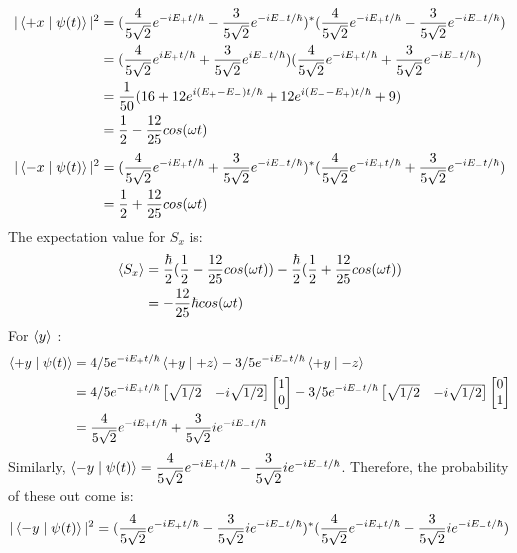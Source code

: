 \documentclass{article}
\providecommand{\Matrix}[1] {\begin{bmatrix} #1 \end{bmatrix}}
\theoremstyle{definition}
\theoremstyle{plain}
\begin{document}
\begin {enumerate}[itemindent=30pt,label=\bf Exercise {\arabic*}:]
\begin{align*}
	|\Braket{+x \mid \psi(t)}|^{2} &= (\dfrac{4}{5\sqrt{2}} e^{-iE_{+}t/\hbar}- \dfrac{3}{5\sqrt{2}} e^{-iE_{-}t/\hbar})^{*}(\dfrac{4}{5\sqrt{2}} e^{-iE_{+}t/\hbar}- \dfrac{3}{5\sqrt{2}} e^{-iE_{-}t/\hbar})\\ 
	&=(\dfrac{4}{5\sqrt{2}} e^{iE_{+}t/\hbar} + \dfrac{3}{5\sqrt{2}} e^{iE_{-}t/\hbar})(\dfrac{4}{5\sqrt{2}} e^{-iE_{+}t/\hbar} + \dfrac{3}{5\sqrt{2}} e^{-iE_{-}t/\hbar})\\  
	&= \dfrac{1}{50}(16 + 12e^{i(E_{+} - E_{-})t / \hbar} + 12e^{i(E_{-} - E_{+})t / \hbar} + 9)\\
	&= \dfrac{1}{2} - \dfrac{12}{25} cos(\omega t)
\end{align*}
\begin{align*}
	|\Braket{-x \mid \psi(t)}|^{2} &= (\dfrac{4}{5\sqrt{2}} e^{-iE_{+}t/\hbar}+ \dfrac{3}{5\sqrt{2}} e^{-iE_{-}t/\hbar})^{*}(\dfrac{4}{5\sqrt{2}} e^{-iE_{+}t/\hbar} + \dfrac{3}{5\sqrt{2}} e^{-iE_{-}t/\hbar})\\
	&=\dfrac{1}{2} + \dfrac{12}{25} cos(\omega t)
\end{align*}
\subitem The expectation value for $S_{x}$ is:
\begin{align*}
	\Braket{S_{x}} &= \dfrac{\hbar}{2}(\dfrac{1}{2} - \dfrac{12}{25} cos(\omega t)) - \dfrac{\hbar}{2}(\dfrac{1}{2} + \dfrac{12}{25} cos(\omega t))\\
	&= -\dfrac{12}{25} \hbar cos(\omega t)
\end{align*}
\subitem For $\Braket{y}$ :
\begin{align*}
	\Braket{+y \mid \psi(t)} &= 4/5 e^{-iE_{+}t/\hbar}\Braket{+y \mid +z} -3/5 e^{-iE_{-}t/\hbar}\Braket{+y \mid -z}\\
	&= 4/5 e^{-iE_{+}t/\hbar}\Matrix{\sqrt{1/2} & -i\sqrt{1/2}} \Matrix{1 \\ 0} - 3/5 e^{-iE_{-}t/\hbar}\Matrix{\sqrt{1/2} & -i\sqrt{1/2}} \Matrix{0 \\ 1}\\
	&= \dfrac{4}{5\sqrt{2}} e^{-iE_{+}t/\hbar} + \dfrac{3}{5\sqrt{2}} i e^{-iE_{-}t/\hbar}
\end{align*}
\newpage
\subitem Similarly, $\Braket{-y \mid \psi(t)} = \dfrac{4}{5\sqrt{2}} e^{-iE_{+}t/\hbar} - \dfrac{3}{5\sqrt{2}} i e^{-iE_{-}t/\hbar}$. Therefore, the probability of these out come is:
\begin{align*}
	|\Braket{-y \mid \psi(t)}|^{2} &= (\dfrac{4}{5\sqrt{2}} e^{-iE_{+}t/\hbar} - \dfrac{3}{5\sqrt{2}} i e^{-iE_{-}t/\hbar})^{*}(\dfrac{4}{5\sqrt{2}} e^{-iE_{+}t/\hbar} - \dfrac{3}{5\sqrt{2}} i e^{-iE_{-}t/\hbar})\\ 

\end{align*}
\end{enumerate}
\end{document}

